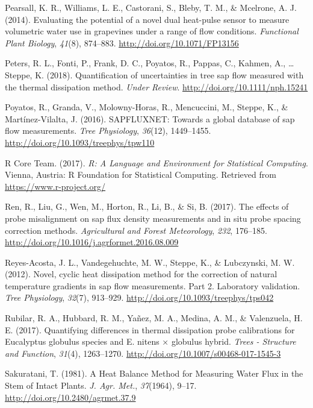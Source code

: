 \documentclass[11pt,twoside]{reedthesis}
\begin{document}
\hypertarget{ref-Pearsall2014}{}
Pearsall, K. R., Williams, L. E., Castorani, S., Bleby, T. M., \&
Mcelrone, A. J. (2014). Evaluating the potential of a novel dual
heat-pulse sensor to measure volumetric water use in grapevines under a
range of flow conditions. \emph{Functional Plant Biology}, \emph{41}(8),
874--883. \url{http://doi.org/10.1071/FP13156}

\hypertarget{ref-Peters2018}{}
Peters, R. L., Fonti, P., Frank, D. C., Poyatos, R., Pappas, C., Kahmen,
A., \ldots{} Steppe, K. (2018). Quantification of uncertainties in tree
sap flow measured with the thermal dissipation method. \emph{Under
Review}. \url{http://doi.org/10.1111/nph.15241}

\hypertarget{ref-Poyatos2016}{}
Poyatos, R., Granda, V., Molowny-Horas, R., Mencuccini, M., Steppe, K.,
\& Martínez-Vilalta, J. (2016). SAPFLUXNET: Towards a global database of
sap flow measurements. \emph{Tree Physiology}, \emph{36}(12),
1449--1455. \url{http://doi.org/10.1093/treephys/tpw110}

\hypertarget{ref-RCoreTeam2017}{}
R Core Team. (2017). \emph{R: A Language and Environment for Statistical
Computing}. Vienna, Austria: R Foundation for Statistical Computing.
Retrieved from \url{https://www.r-project.org/}

\hypertarget{ref-Ren2017}{}
Ren, R., Liu, G., Wen, M., Horton, R., Li, B., \& Si, B. (2017). The
effects of probe misalignment on sap flux density measurements and in
situ probe spacing correction methods. \emph{Agricultural and Forest
Meteorology}, \emph{232}, 176--185.
\url{http://doi.org/10.1016/j.agrformet.2016.08.009}

\hypertarget{ref-Reyes-Acosta2012}{}
Reyes-Acosta, J. L., Vandegehuchte, M. W., Steppe, K., \& Lubczynski, M.
W. (2012). Novel, cyclic heat dissipation method for the correction of
natural temperature gradients in sap flow measurements. Part 2.
Laboratory validation. \emph{Tree Physiology}, \emph{32}(7), 913--929.
\url{http://doi.org/10.1093/treephys/tps042}

\hypertarget{ref-Rubilar2017}{}
Rubilar, R. A., Hubbard, R. M., Yañez, M. A., Medina, A. M., \&
Valenzuela, H. E. (2017). Quantifying differences in thermal dissipation
probe calibrations for Eucalyptus globulus species and E. nitens ×
globulus hybrid. \emph{Trees - Structure and Function}, \emph{31}(4),
1263--1270. \url{http://doi.org/10.1007/s00468-017-1545-3}

\hypertarget{ref-Sakuratani1981}{}
Sakuratani, T. (1981). A Heat Balance Method for Measuring Water Flux in
the Stem of Intact Plants. \emph{J. Agr. Met.}, \emph{37}(1964), 9--17.
\url{http://doi.org/10.2480/agrmet.37.9}
\end{document}
